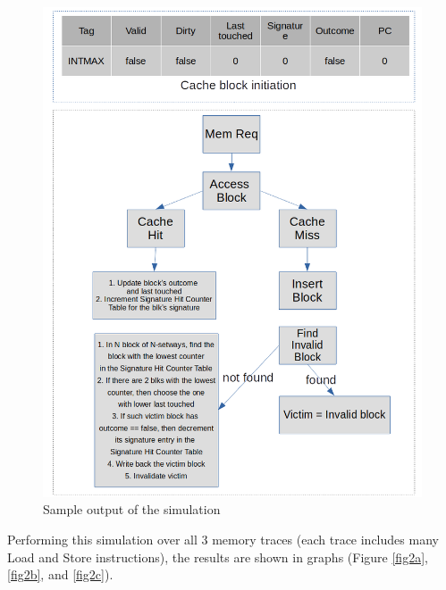 \documentclass[letterpaper, 11pt]{article}
\begin{document}
	\begin{figure}[htb!]
		\centering
		\includegraphics[width=0.7\linewidth]{pseudo_code_and_diagram.png}
		\caption{Sample output of the simulation}
		\label{fig1}
	\end{figure}

	\newpage
	
	Performing this simulation over all 3 memory traces (each trace includes many Load and Store instructions), the results are shown in graphs (Figure \ref{fig2a}, \ref{fig2b}, and \ref{fig2c}).
	
	\newpage
	
\end{document}
